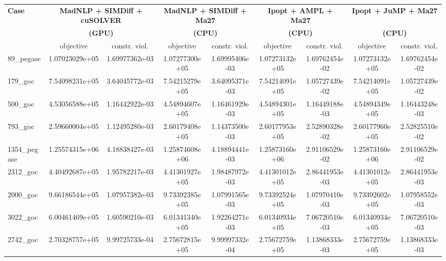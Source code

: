 \begin{tabular}{|l|cc|cc|cc|cc|}
  \hline
  \multirow{3}{*}{\textbf{Case}}
  & \multicolumn{2}{c|}{\textbf{MadNLP + SIMDiff + cuSOLVER}}
  & \multicolumn{2}{c|}{\textbf{MadNLP + SIMDiff + Ma27}}
  & \multicolumn{2}{c|}{\textbf{Ipopt + AMPL + Ma27}}
  & \multicolumn{2}{c|}{\textbf{Ipopt + JuMP + Ma27}}\\
  &\multicolumn{2}{c|}{\textbf{(GPU)}} &\multicolumn{2}{c|}{\textbf{(CPU)}} &\multicolumn{2}{c|}{\textbf{(CPU)}}&\multicolumn{2}{c|}{\textbf{(CPU)}}
  \\
  \cline{2-9}
  & objective & constr. viol.
  & objective & constr. viol.
  & objective & constr. viol.
  & objective & constr. viol.
  \\
  \hline
89\_pegase 
& 1.07023029e+05
& 1.69977362e-03
& 1.07277300e+05
& 1.69995406e-03
& 1.07273132e+05
& 1.69762454e-02
& 1.07273132e+05
& 1.69762454e-02
\\

179\_goc 
& 7.54098231e+05
& 3.64045772e-03
& 7.54215279e+05
& 3.64095371e-03
& 7.54214091e+05
& 1.05727439e-02
& 7.54214091e+05
& 1.05727439e-02
\\

500\_goc 
& 4.53056588e+05
& 1.16442922e-03
& 4.54894607e+05
& 1.16461929e-03
& 4.54894301e+05
& 1.16449188e-03
& 4.54894349e+05
& 1.16443248e-03
\\

793\_goc 
& 2.59660004e+05
& 1.12495280e-03
& 2.60179408e+05
& 1.14373500e-03
& 2.60177953e+05
& 2.52890328e-02
& 2.60177960e+05
& 2.52825510e-02
\\

1354\_pegase 
& 1.25574315e+06
& 4.18838427e-03
& 1.25874608e+06
& 4.18894441e-03
& 1.25873160e+06
& 2.91106529e-02
& 1.25873160e+06
& 2.91106529e-02
\\
\hline
2312\_goc 
& 4.40492687e+05
& 1.95782217e-03
& 4.41301927e+05
& 1.98487972e-03
& 4.41301012e+05
& 2.86441953e-03
& 4.41301012e+05
& 2.86441953e-03
\\

2000\_goc 
& 9.66186544e+05
& 1.07957382e-03
& 9.73392385e+05
& 1.07991565e-03
& 9.73392524e+05
& 1.07970410e-03
& 9.73392602e+05
& 1.07958552e-03
\\

3022\_goc 
& 6.00461469e+05
& 1.60590210e-03
& 6.01341340e+05
& 1.92264271e-03
& 6.01340934e+05
& 7.06720510e-03
& 6.01340934e+05
& 7.06720510e-03
\\

2742\_goc 
& 2.70328757e+05
& 9.99725733e-04
& 2.75672815e+05
& 9.99997332e-04
& 2.75672759e+05
& 1.13868333e-03
& 2.75672759e+05
& 1.13868333e-03
\\


\end{tabular}

